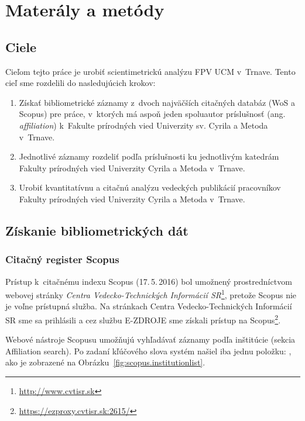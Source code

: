 \chapter{Materály a metódy}

\section{Ciele}

Cieľom tejto práce je urobiť scientimetrickú analýzu FPV UCM v~Trnave.  Tento
cieľ sme rozdelili do nasledujúcich krokov:

\begin{enumerate}
\item Získať bibliometrické záznamy z~dvoch najväčších citačných databáz (WoS a
  Scopus) pre práce, v~ktorých má aspoň jeden spoluautor príslušnosť
  (ang.\,\emph{affiliation}) k~Fakulte prírodných vied Univerzity sv. Cyrila a
  Metoda v~Trnave.
\item Jednotlivé záznamy rozdeliť podľa príslušnosti ku jednotlivým katedrám
  Fakulty prírodných vied Univerzity Cyrila a Metoda v~Trnave.
\item Urobiť kvantitatívnu a citačnú analýzu vedeckých publikácií pracovníkov
  Fakulty prírodných vied Univerzity Cyrila a Metoda v~Trnave.
\end{enumerate}


\section{Získanie bibliometrických dát}

\subsection{Citačný register Scopus}

Prístup k~citačnému indexu Scopus (17.\,5.\,2016) bol umožnený prostredníctvom
webovej stránky \emph{Centra Vedecko-Technických Informácií
  SR}\footnote{\url{http://www.cvtisr.sk}}, pretože Scopus nie je voľne
prístupná služba.  Na stránkach Centra Vedecko-Technických Informácií SR sme sa
prihlásili a cez službu E-ZDROJE sme získali prístup na
Scopus\footnote{\url{https://ezproxy.cvtisr.sk:2615/}}.

Webové nástroje Scopusu umožňujú vyhľadávať záznamy podľa inštitúcie (sekcia
Affiliation search).  Po zadaní kľúčového slova  systém našiel iba
jednu položku: , ako je
zobrazené na Obrázku~\ref{fig:scopus.institutionlist}.

